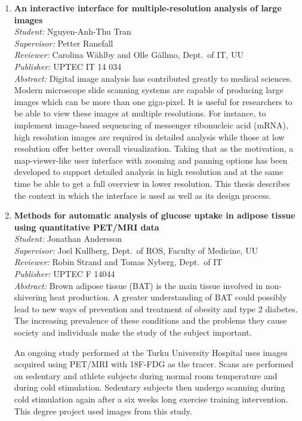 \begin{small}
\begin{enumerate}
\item\textbf{An interactive interface for multiple-resolution analysis of large images}\\
  \emph{Student:} Nguyen-Anh-Thu Tran\\
  \emph{Supervisor:} Petter Ranefall\\
  \emph{Reviewer:} Carolina Wählby and Olle Gällmo, Dept.~of IT, UU\\
  \emph{Publisher:} UPTEC IT 14 034\\
  \emph{Abstract:} Digital image analysis has contributed greatly to medical sciences. Modern microscope slide scanning systems are capable of producing large images which can be more than one giga-pixel. It is useful for researchers to be able to view these images at multiple resolutions. For instance, to implement image-based sequencing of messenger ribonucleic acid (mRNA), high resolution images are required in detailed analysis while those at low resolution offer better  overall visualization. Taking that as the motivation, a map-viewer-like user interface with zooming and panning options has been developed to support detailed analysis in high resolution and at the same time be able to get a full overview in lower resolution. This thesis describes the context in which the interface is used as well as its design process.

\item\textbf{Methods for automatic analysis of glucose uptake in adipose tissue using quantitative PET/MRI data}\\
  \emph{Student:} Jonathan Andersson \\
  \emph{Supervisor:} Joel Kullberg, Dept.~of ROS, Faculty of Medicine, UU\\
  \emph{Reviewer:} Robin Strand and Tomas Nyberg, Dept.~of IT\\
  \emph{Publisher:} UPTEC F 14044\\
  \emph{Abstract:} Brown adipose tissue (BAT) is the main tissue involved in non-shivering heat production. A greater understanding of BAT could possibly lead to new ways of prevention and treatment of obesity and type 2 diabetes. The increasing prevalence of these conditions and the problems they cause society and individuals make the study of the subject important.

An ongoing study performed at the Turku University Hospital uses images acquired using PET/MRI with 18F-FDG as the tracer. Scans are performed on sedentary and athlete subjects during normal room temperature and during cold stimulation. Sedentary subjects then undergo scanning during cold stimulation again after a six weeks long exercise training intervention. This degree project used images from this study.


\end{enumerate}
\end{small}
